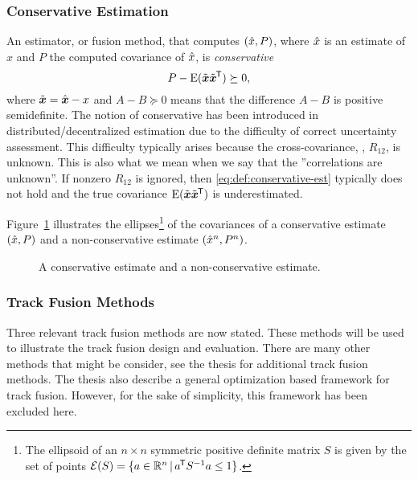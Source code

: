 \subsubsection{Conservative Estimation}

An estimator, or fusion method, that computes $(\xhat,P)$, where $\xhat$ is an estimate of $x$ and $P$ the computed covariance of $\xhat$, is \emph{conservative} \textiff 
\begin{equation}
	P - \EV(\tbfx\tbfx\trnsp) \succeq 0,
	\label{eq:def:conservative-est}
\end{equation}
where $\tbfx=\hbfx-x$ and $A-B\succeq 0$ means that the difference $A-B$ is positive semidefinite. The notion of conservative has been introduced in distributed/decentralized estimation due to the difficulty of correct uncertainty assessment. This difficulty typically arises because the cross-covariance, \eg, $R_{12}$, is unknown. This is also what we mean when we say that the ''correlations are unknown''. If nonzero $R_{12}$ is ignored, then \eqref{eq:def:conservative-est} typically does not hold and the true covariance $\EV(\tbfx\tbfx\trnsp)$ is underestimated.

Figure~\ref{fig:example:conservative-nonconservative-estimate} illustrates the ellipses\footnote{The ellipsoid of an $n\times n$ symmetric positive definite matrix $S$ is given by the set of points $\calE(S)=\{a\in\realsn\,|\, a\trnsp S\inv a\leq 1\}$.} of the covariances of a conservative estimate $(\xhat,P)$ and a non-conservative estimate $(\xhat^n,P^n)$.

\begin{figure}[tb]
	\centering
	\begin{tikzpicture}[scale=.4]
		
	\end{tikzpicture}
	\caption{A conservative estimate and a non-conservative estimate.}
	\label{fig:example:conservative-nonconservative-estimate}
\end{figure}


\subsubsection{Track Fusion Methods}

Three relevant track fusion methods are now stated. These methods will be used to illustrate the track fusion design and evaluation. There are many other methods that might be consider, see the thesis \cite{Forsling2023Phd} for additional track fusion methods. The thesis also describe a general optimization based framework for track fusion. However, for the sake of simplicity, this framework has been excluded here.

